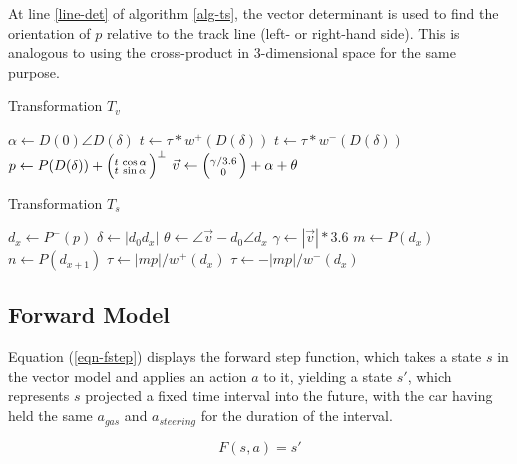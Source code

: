 \documentclass[conference]{IEEEtran}
\newcommand{\vect}[2]{\ensuremath{\Bigl(\negthinspace\begin{smallmatrix}#1\\#2\end{smallmatrix}}\Bigr)}
\begin{document}
At line \ref{line-det} of algorithm \ref{alg-ts}, the vector determinant is used to find the orientation of $p$ relative to the track line (left- or right-hand side). This is analogous to using the cross-product in 3-dimensional space \cite{crossp} for the same purpose.

\begin{algorithm}
\caption{Transformation $T_v$}
\label{alg-tv}
\begin{algorithmic}[1]
\State $\alpha \gets D(0) \angle D(\delta)$
	\State $t \gets \tau * w^+(D(\delta))$
\Else
	\State $t \gets \tau * w^-(D(\delta))$
\EndIf
\State $p \gets P(D(\delta))+\vect{t & \cos{\alpha}}{t & \sin{\alpha}}^\bot$ \label{line-ass-p} 
\State $\vec{v} \gets \vect{\gamma / 3.6}{0}+\alpha+\theta$ \label{line-ass-v} 
\end{algorithmic}
\end{algorithm}

\begin{algorithm}
\caption{Transformation $T_s$}
\label{alg-ts}
\begin{algorithmic}[1]
\State $d_x \gets P^-(p)$ 
\State $\delta \gets |d_0 d_x|$ \label{line-ass-delta}
\State $\theta \gets \angle\vec{v} - d_0 \angle d_x$ \label{line-ass-theta}
\State $\gamma \gets |\vec{v}| * 3.6$ \label{line-ass-gamma} 
\State $m \gets P(d_x)$
\State $n \gets P(d_{x+1})$
  \label{line-det}
	\State $\tau \gets |mp| / w^+(d_x)$ \label{line-ass-tau1}
\Else
	\State $\tau \gets -|mp| / w^-(d_x)$ \label{line-ass-tau2}
\EndIf
\end{algorithmic}
\end{algorithm}

\subsection{Forward Model}

Equation (\ref{eqn-fstep}) displays the forward step function, which takes a state $s$ in the vector model and applies an action $a$ to it, yielding a state $s'$, which represents $s$ projected a fixed time interval into the future, with the car having held the same $a_{gas}$ and $a_{steering}$ for the duration of the interval.

\begin{equation}
\label{eqn-fstep}
F(s,a)=s'
\end{equation}
\end{document}
